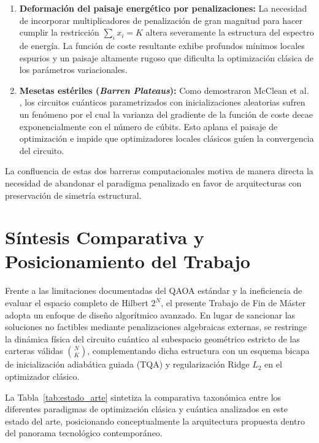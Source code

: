 \begin{enumerate}
    \item \textbf{Deformación del paisaje energético por penalizaciones:} La necesidad de incorporar multiplicadores de penalización de gran magnitud para hacer cumplir la restricción $\sum_i x_i = K$ altera severamente la estructura del espectro de energía. La función de coste resultante exhibe profundos mínimos locales espurios y un paisaje altamente rugoso que dificulta la optimización clásica de los parámetros variacionales.
    
    \item \textbf{Mesetas estériles (\textit{Barren Plateaus}):} Como demostraron McClean et al. \cite{McClean2018}, los circuitos cuánticos parametrizados con inicializaciones aleatorias sufren un fenómeno por el cual la varianza del gradiente de la función de coste decae exponencialmente con el número de cúbits. Esto aplana el paisaje de optimización e impide que optimizadores locales clásicos guíen la convergencia del circuito.
\end{enumerate}

La confluencia de estas dos barreras computacionales motiva de manera directa la necesidad de abandonar el paradigma penalizado en favor de arquitecturas con preservación de simetría estructural.

\section{Síntesis Comparativa y Posicionamiento del Trabajo}
\label{sec:sintesis_posicionamiento}

Frente a las limitaciones documentadas del QAOA estándar y la ineficiencia de evaluar el espacio completo de Hilbert $2^N$, el presente Trabajo de Fin de Máster adopta un enfoque de diseño algorítmico avanzado. En lugar de sancionar las soluciones no factibles mediante penalizaciones algebraicas externas, se restringe la dinámica física del circuito cuántico al subespacio geométrico estricto de las carteras válidas $\binom{N}{K}$, complementando dicha estructura con un esquema bicapa de inicialización adiabática guiada (TQA) y regularización Ridge $L_2$ en el optimizador clásico.

La Tabla~\ref{tab:estado_arte} sintetiza la comparativa taxonómica entre los diferentes paradigmas de optimización clásica y cuántica analizados en este estado del arte, posicionando conceptualmente la arquitectura propuesta dentro del panorama tecnológico contemporáneo.

